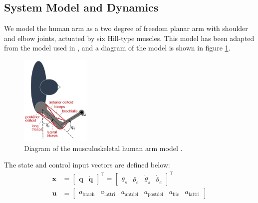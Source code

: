 \documentclass[letterpaper, 10pt, conference]{ieeeconf}
\begin{document}
\subsection{System Model and Dynamics}
We model the human arm as a two degree of freedom planar arm with shoulder and elbow joints, actuated by six Hill-type muscles. This model has been adapted from the model used in \cite{c7}, and a diagram of the model is shown in figure \ref{fig:arm_model}. 

\begin{figure}[h]
    \centering
    \includegraphics[width=0.3\textwidth]{images/arm_model_diagram.png}
    \caption{Diagram of the musculoskeletal human arm model \cite{c7}.}
    \label{fig:arm_model}
\end{figure}

The state and control input vectors are defined below:
\begin{align}
    \mathbf{x} &= \begin{bmatrix}
        \mathbf{q} &
        \dot{\mathbf{q}}
    \end{bmatrix}^\top = \begin{bmatrix}
        \theta_s &
        \theta_e &
        \dot{\theta}_s &
        \dot{\theta}_e
    \end{bmatrix}^\top \\
    \mathbf{u} &= \begin{bmatrix}
        a_{\text{brach}} & a_{\text{lattri}} & a_{\text{antdel}} & a_{\text{postdel}} & a_{\text{bic}} & a_{\text{lattri}}
    \end{bmatrix}
\end{align}
\end{document}
